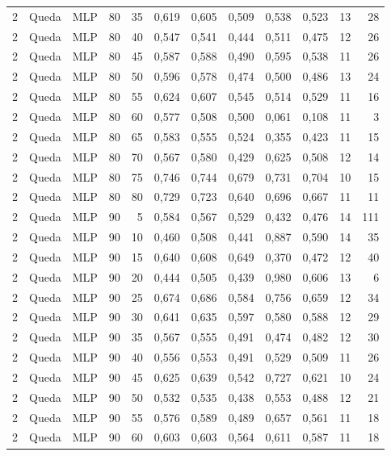 \begin{longtable}{@{}rllrrrrrrrrr@{}}
2 & Queda & MLP & 80 & 35 & 0,619 & 0,605 & 0,509 & 0,538 & 0,523 & 13 & 28 \\
2 & Queda & MLP & 80 & 40 & 0,547 & 0,541 & 0,444 & 0,511 & 0,475 & 12 & 26 \\
2 & Queda & MLP & 80 & 45 & 0,587 & 0,588 & 0,490 & 0,595 & 0,538 & 11 & 26 \\
2 & Queda & MLP & 80 & 50 & 0,596 & 0,578 & 0,474 & 0,500 & 0,486 & 13 & 24 \\
2 & Queda & MLP & 80 & 55 & 0,624 & 0,607 & 0,545 & 0,514 & 0,529 & 11 & 16 \\
2 & Queda & MLP & 80 & 60 & 0,577 & 0,508 & 0,500 & 0,061 & 0,108 & 11 & 3 \\
2 & Queda & MLP & 80 & 65 & 0,583 & 0,555 & 0,524 & 0,355 & 0,423 & 11 & 15 \\
2 & Queda & MLP & 80 & 70 & 0,567 & 0,580 & 0,429 & 0,625 & 0,508 & 12 & 14 \\
2 & Queda & MLP & 80 & 75 & 0,746 & 0,744 & 0,679 & 0,731 & 0,704 & 10 & 15 \\
2 & Queda & MLP & 80 & 80 & 0,729 & 0,723 & 0,640 & 0,696 & 0,667 & 11 & 11 \\
2 & Queda & MLP & 90 & 5 & 0,584 & 0,567 & 0,529 & 0,432 & 0,476 & 14 & 111 \\
2 & Queda & MLP & 90 & 10 & 0,460 & 0,508 & 0,441 & 0,887 & 0,590 & 14 & 35 \\
2 & Queda & MLP & 90 & 15 & 0,640 & 0,608 & 0,649 & 0,370 & 0,472 & 12 & 40 \\
2 & Queda & MLP & 90 & 20 & 0,444 & 0,505 & 0,439 & 0,980 & 0,606 & 13 & 6 \\
2 & Queda & MLP & 90 & 25 & 0,674 & 0,686 & 0,584 & 0,756 & 0,659 & 12 & 34 \\
2 & Queda & MLP & 90 & 30 & 0,641 & 0,635 & 0,597 & 0,580 & 0,588 & 12 & 29 \\
2 & Queda & MLP & 90 & 35 & 0,567 & 0,555 & 0,491 & 0,474 & 0,482 & 12 & 30 \\
2 & Queda & MLP & 90 & 40 & 0,556 & 0,553 & 0,491 & 0,529 & 0,509 & 11 & 26 \\
2 & Queda & MLP & 90 & 45 & 0,625 & 0,639 & 0,542 & 0,727 & 0,621 & 10 & 24 \\
2 & Queda & MLP & 90 & 50 & 0,532 & 0,535 & 0,438 & 0,553 & 0,488 & 12 & 21 \\
2 & Queda & MLP & 90 & 55 & 0,576 & 0,589 & 0,489 & 0,657 & 0,561 & 11 & 18 \\
2 & Queda & MLP & 90 & 60 & 0,603 & 0,603 & 0,564 & 0,611 & 0,587 & 11 & 18 \\

\end{longtable}
